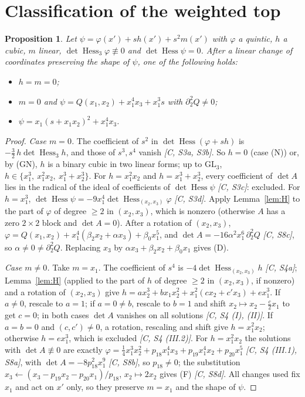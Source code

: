 \documentclass[11pt]{article}
\newtheorem{proposition}[theorem]{Proposition}
\theoremstyle{remark}
\newcommand{\Hess}{\operatorname{Hess}}
\begin{document}
\section{Classification of the weighted top}
\begin{proposition}\label{prop:class}
Let $\psi=\varphi(x')+sh(x')+s^2m(x')$ with $\varphi$ a quintic, $h$ a cubic, $m$ linear, $\det\Hess_3\varphi\not\equiv0$ and $\det\Hess\psi=0$. After a linear change of coordinates preserving the shape of $\psi$, one of the following holds:
\begin{itemize}
\item[(N)] $h=m=0$;
\item[(D)] $m=0$ and $\psi=Q(x_1,x_2)+x_1^4x_3+x_1^3s$ with $\partial_2^2Q\ne0$;
\item[(F)] $\psi=x_1(s+x_1x_2)^2+x_1^4x_3$.
\end{itemize}
\end{proposition}
\begin{proof}
\emph{Case $m=0$.} The coefficient of $s^2$ in $\det\Hess(\varphi+sh)$ is $-\tfrac32\,h\det\Hess_3h$, and those of $s^3,s^4$ vanish \emph{[C, S3a, S3b]}. So $h=0$ (case (N)) or, by (GN), $h$ is a binary cubic in two linear forms; up to $\mathrm{GL}_3$, $h\in\{x_1^3,\ x_1^2x_2,\ x_1^3+x_2^3\}$. For $h=x_1^2x_2$ and $h=x_1^3+x_2^3$, every coefficient of $\det A$ lies in the radical of the ideal of coefficients of $\det\Hess\psi$ \emph{[C, S3c]}: excluded. For $h=x_1^3$, $\det\Hess\psi=-9x_1^4\det\Hess_{(x_2,x_3)}\varphi$ \emph{[C, S3d]}. Apply Lemma~\ref{lem:H} to the part of $\varphi$ of degree $\ge2$ in $(x_2,x_3)$, which is nonzero (otherwise $A$ has a zero $2\times2$ block and $\det A=0$). After a rotation of $(x_2,x_3)$, $\varphi=Q(x_1,x_2)+x_1^4(\beta_2x_2+\alpha x_3)+\beta_0x_1^5$, and $\det A=-16\alpha^2x_1^6\,\partial_2^2Q$ \emph{[C, S8c]}, so $\alpha\ne0\ne\partial_2^2Q$. Replacing $x_3$ by $\alpha x_3+\beta_2x_2+\beta_0x_1$ gives (D).

\emph{Case $m\ne0$.} Take $m=x_1$. The coefficient of $s^4$ is $-4\det\Hess_{(x_2,x_3)}h$ \emph{[C, S4a]}; Lemma~\ref{lem:H} (applied to the part of $h$ of degree $\ge2$ in $(x_2,x_3)$, if nonzero) and a rotation of $(x_2,x_3)$ give $h=a x_2^3+bx_1x_2^2+x_1^2(cx_2+c'x_3)+ex_1^3$. If $a\ne0$, rescale to $a=1$; if $a=0\ne b$, rescale to $b=1$ and shift $x_2\mapsto x_2-\tfrac c2x_1$ to get $c=0$; in both cases $\det A$ vanishes on all solutions \emph{[C, S4 (I), (II)]}. If $a=b=0$ and $(c,c')\ne0$, a rotation, rescaling and shift give $h=x_1^2x_2$; otherwise $h=ex_1^3$, which is excluded \emph{[C, S4 (III.2)]}. For $h=x_1^2x_2$ the solutions with $\det A\not\equiv0$ are exactly $\varphi=\tfrac14x_1^3x_2^2+p_{18}x_1^4x_3+p_{19}x_1^4x_2+p_{20}x_1^5$ \emph{[C, S4 (III.1), S8a]}, with $\det A=-8p_{18}^2x_1^9$ \emph{[C, S8b]}, so $p_{18}\ne0$; the substitution $x_3\leftarrow(x_3-p_{19}x_2-p_{20}x_1)/p_{18}$, $x_2\mapsto2x_2$ gives (F) \emph{[C, S8d]}. All changes used fix $x_1$ and act on $x'$ only, so they preserve $m=x_1$ and the shape of $\psi$.
\end{proof}
\end{document}
